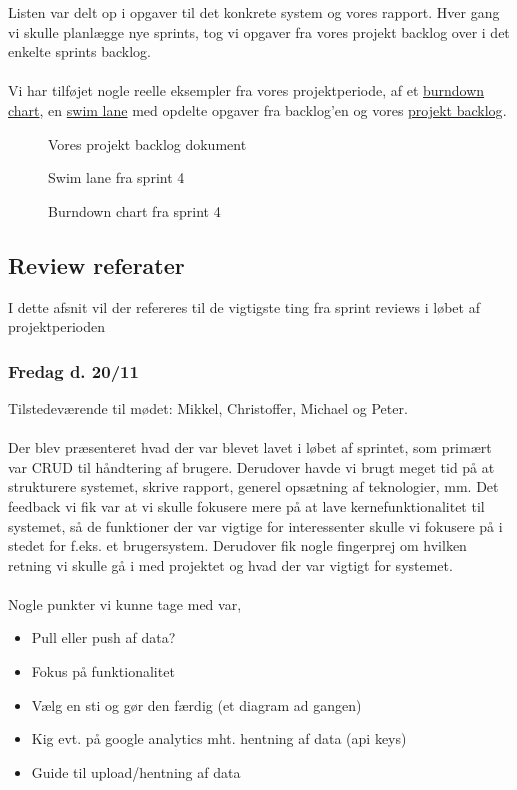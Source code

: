 Listen var delt op i opgaver til det konkrete system og vores rapport. Hver gang vi skulle planlægge nye sprints, tog vi opgaver fra vores projekt backlog over i det enkelte sprints backlog.
\\\\
Vi har tilføjet nogle reelle eksempler fra vores projektperiode, af et \hyperref[fig:burndown-chart]{burndown chart}, en \hyperref[fig:swim-lane]{swim lane} med opdelte opgaver fra backlog'en og vores \hyperref[fig:projekt-backlog]{projekt backlog}.
\begin{figure}[H]
    \caption{Vores projekt backlog dokument}
    \label{fig:projekt-backlog}
\end{figure}
\begin{figure}[H]
    \caption{Swim lane fra sprint 4}
    \label{fig:swim-lane}
\end{figure}
\begin{figure}[H]
    \caption{Burndown chart fra sprint 4}
    \label{fig:burndown-chart}
\end{figure}
\subsection{Review referater}
I dette afsnit vil der refereres til de vigtigste ting fra sprint reviews i løbet af projektperioden
\subsubsection{Fredag d. 20/11}
Tilstedeværende til mødet: Mikkel, Christoffer, Michael og Peter.
\\\\
Der blev præsenteret hvad der var blevet lavet i løbet af sprintet, som primært var CRUD til håndtering af brugere. Derudover havde vi brugt meget tid på at strukturere systemet, skrive rapport, generel opsætning af teknologier, mm.
Det feedback vi fik var at vi skulle fokusere mere på at lave kernefunktionalitet til systemet, så de funktioner der var vigtige for interessenter skulle vi fokusere på i stedet for f.eks. et brugersystem.
Derudover fik nogle fingerprej om hvilken retning vi skulle gå i med projektet og hvad der var vigtigt for systemet.
\\\\
Nogle punkter vi kunne tage med var,
\begin{itemize}
    \item{Pull eller push af data?}
    \item{Fokus på funktionalitet}
    \item{Vælg en sti og gør den færdig (et diagram ad gangen)}
    \item{Kig evt. på google analytics mht. hentning af data (api keys)}
    \item{Guide til upload/hentning af data}
\end{itemize}
